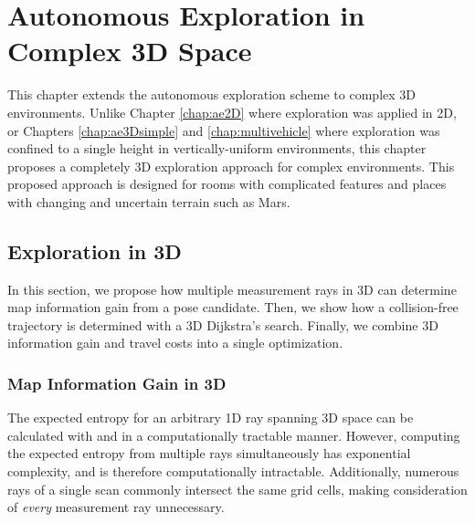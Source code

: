 
\chapter{Autonomous Exploration in Complex 3D Space} \label{chap:ae3Dcomplex}

This chapter extends the autonomous exploration scheme to complex 3D environments. Unlike Chapter \ref{chap:ae2D} where exploration was applied in 2D, or Chapters \ref{chap:ae3Dsimple} and \ref{chap:multivehicle} where exploration was confined to a single height in vertically-uniform environments, this chapter proposes a completely 3D exploration approach for complex environments. This proposed approach is designed for rooms with complicated features and places with changing and uncertain terrain such as Mars.

\section{Exploration in 3D}

In this section, we propose how multiple measurement rays in 3D can determine map information gain from a pose candidate. Then, we show how a collision-free trajectory is determined with a 3D Dijkstra's search. Finally, we combine 3D information gain and travel costs into a single optimization.

\subsection{Map Information Gain in 3D}

The expected entropy for an arbitrary 1D ray spanning 3D space can be calculated with  and  in a computationally tractable manner. However, computing the expected entropy from multiple rays simultaneously has exponential complexity, and is therefore computationally intractable. Additionally, numerous rays of a single scan commonly intersect the same grid cells, making consideration of \emph{every} measurement ray unnecessary.

